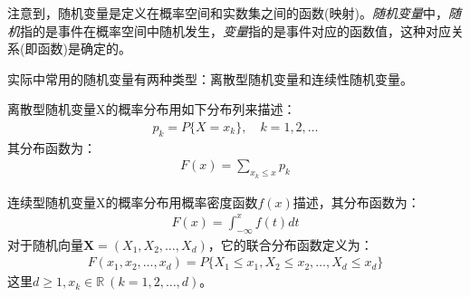注意到，随机变量是定义在概率空间和实数集之间的函数(映射)。\emph{随机变量}中，\emph{随机}指的是事件在概率空间中随机发生，\emph{变量}指的是事件对应的函数值，这种对应关系(即函数)是确定的。

实际中常用的随机变量有两种类型：离散型随机变量和连续性随机变量。

离散型随机变量X的概率分布用如下分布列来描述：
\begin{align*}
	p_k=P\{X=x_k\},\quad k=1,2,\dots
\end{align*}
其分布函数为：
\begin{align*}
	F(x)=\sum_{x_k\leqslant x}p_k
\end{align*}

连续型随机变量X的概率分布用概率密度函数\(f(x)\)描述，其分布函数为：
\begin{align*}
	F(x)=\int_{-\infty}^{x}f(t)dt
\end{align*}
对于随机向量\(\mathbf{X}=(X_1,X_2,\dots,X_d)\)，它的联合分布函数定义为：
\begin{align*}
	F(x_1,x_2,\dots,x_d)=P\{X_1\leqslant x_1,X_2\leqslant x_2,\dots,X_d\leqslant x_d\}
\end{align*}
这里\(d\geqslant 1,x_k\in \mathbb{R}\ (k=1,2,\dots ,d)\)。

